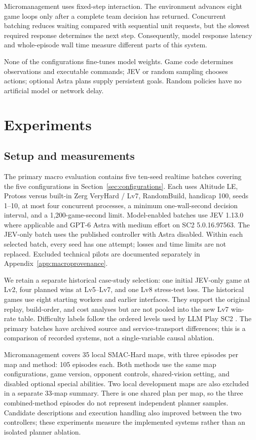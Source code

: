 \documentclass{article}
\begin{document}
Micromanagement uses fixed-step interaction. The environment advances eight game loops only after a complete team decision has returned. Concurrent batching reduces waiting compared with sequential unit requests, but the slowest required response determines the next step. Consequently, model response latency and whole-episode wall time measure different parts of this system.

None of the configurations fine-tunes model weights. Game code determines observations and executable commands; JEV or random sampling chooses actions; optional Astra plans supply persistent goals. Random policies have no artificial model or network delay.

\section{Experiments}

\subsection{Setup and measurements}

The primary macro evaluation contains five ten-seed realtime batches covering the five configurations in Section~\ref{sec:configurations}. Each uses Altitude LE, Protoss versus built-in Zerg VeryHard / Lv7, RandomBuild, handicap 100, seeds 1--10, at most four concurrent processes, a minimum one-wall-second decision interval, and a 1,200-game-second limit. Model-enabled batches use JEV 1.13.0 where applicable and GPT-6 Astra with medium effort on SC2 5.0.16.97563. The JEV-only batch uses the published controller with Astra disabled. Within each selected batch, every seed has one attempt; losses and time limits are not replaced. Excluded technical pilots are documented separately in Appendix~\ref{app:macroprovenance}.

We retain a separate historical case-study selection: one initial JEV-only game at Lv2, four planned wins at Lv5--Lv7, and one Lv8 stress-test loss. The historical games use eight starting workers and earlier interfaces. They support the original replay, build-order, and cost analyses but are not pooled into the new Lv7 win-rate table. Difficulty labels follow the ordered levels used by LLM Play SC2 \citep{ma2023textsc2}. The primary batches have archived source and service-transport differences; this is a comparison of recorded systems, not a single-variable causal ablation.

Micromanagement covers 35 local SMAC-Hard maps, with three episodes per map and method: 105 episodes each. Both methods use the same map configurations, game version, opponent controls, shared-vision setting, and disabled optional special abilities. Two local development maps are also excluded in a separate 33-map summary. There is one shared plan per map, so the three combined-method episodes do not represent independent planner samples. Candidate descriptions and execution handling also improved between the two controllers; these experiments measure the implemented systems rather than an isolated planner ablation.
\end{document}
